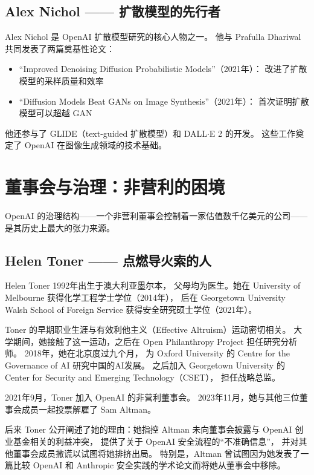 \subsection{Alex Nichol —— 扩散模型的先行者}
\label{subsec:alex-nichol}

Alex Nichol 是 OpenAI 扩散模型研究的核心人物之一。
他与 Prafulla Dhariwal 共同发表了两篇奠基性论文：
\begin{itemize}[noitemsep]
  \item ``Improved Denoising Diffusion Probabilistic Models''（2021年）：
        改进了扩散模型的采样质量和效率
  \item ``Diffusion Models Beat GANs on Image Synthesis''（2021年）：
        首次证明扩散模型可以超越 GAN
\end{itemize}

他还参与了 GLIDE（text-guided 扩散模型）和 DALL$\cdot$E 2 的开发。
这些工作奠定了 OpenAI 在图像生成领域的技术基础。


\section{董事会与治理：非营利的困境}
\label{sec:openai-board}

OpenAI 的治理结构——一个非营利董事会控制着一家估值数千亿美元的公司——
是其历史上最大的张力来源。

\subsection{Helen Toner —— 点燃导火索的人}
\label{subsec:helen-toner}

Helen Toner 1992年出生于澳大利亚墨尔本，
父母均为医生。她在 University of Melbourne 获得化学工程学士学位（2014年），
后在 Georgetown University Walsh School of Foreign Service
获得安全研究硕士学位（2021年）。

Toner 的早期职业生涯与有效利他主义（Effective Altruism）运动密切相关。
大学期间，她接触了这一运动，之后在 Open Philanthropy Project 担任研究分析师。
2018年，她在北京度过九个月，
为 Oxford University 的 Centre for the Governance of AI 研究中国的AI发展。
之后加入 Georgetown University 的 Center for Security and Emerging Technology（CSET），
担任战略总监。

2021年9月，Toner 加入 OpenAI 的非营利董事会。
2023年11月，她与其他三位董事会成员一起投票解雇了 Sam Altman。

后来 Toner 公开阐述了她的理由：她指控 Altman
未向董事会披露与 OpenAI 创业基金相关的利益冲突，
提供了关于 OpenAI 安全流程的``不准确信息''，
并对其他董事会成员撒谎以试图将她排挤出局。
特别是，Altman 曾试图因为她发表了一篇比较 OpenAI 和 Anthropic
安全实践的学术论文而将她从董事会中移除。


